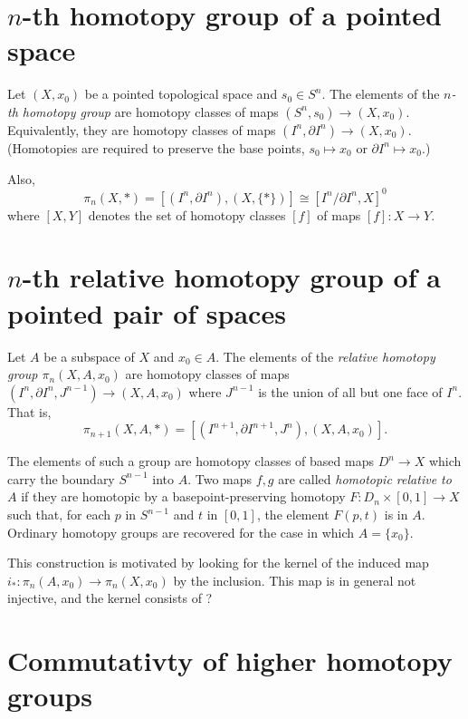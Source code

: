 \section{\texorpdfstring{$n$}{n}-th homotopy group of a pointed space}

\begin{definition}
\label{definition-homotopy-group}
Let $(X,x_0)$ be a pointed topological space and $s_0\in S^n$. The elements of
the {\it $n$-th homotopy group} are homotopy classes of maps
$(S^n,s_0)\to (X,x_0)$. Equivalently, they are homotopy classes of maps
$(I^n,\partial I^n)\to (X,x_0)$. (Homotopies are required to preserve the base
points, $s_0\mapsto x_0$ or $\partial I^n\mapsto x_0$.)

Also,
$$
\pi_n(X,*)=[(I^n,\partial I^n),(X,\{*\})]\cong[I^n/\partial I^n,X]^0
$$
where $[X,Y]$ denotes the set of homotopy classes $[f]$ of maps $[f]:X\to Y$.
\end{definition}

\section{\texorpdfstring{$n$}{n}-th relative homotopy group of 
a pointed pair of spaces}
\label{section-relative-homotopy-group}

\noindent
Let $A$ be a subspace of $X$ and $x_0\in A$. 
The elements of the {\it relative homotopy group $\pi_n(X,A,x_0)$} 
are homotopy classes of maps $(I^n,\partial I^n,J^{n-1})\to (X,A,x_0)$ 
where $J^{n-1}$ is the union of all but one face of $I^n$. 
That is,
$$
\pi_{n+1}(X,A,*)=[(I^{n+1},\partial I^{n+1},J^n),(X,A,x_0)].
$$

The elements of such a group are homotopy classes of based maps 
$D^n\to X$ which carry the boundary $S^{n-1}$ into $A$. 
Two maps $f,g$ are called {\it homotopic relative to $A$} 
if they are homotopic by a basepoint-preserving homotopy
 $F:D_n\times[0,1]\to X$ such that, for each $p$ in $S^{n-1}$ and $t$ in $[0,1]$, 
the element $F(p,t)$ is in $A$. Ordinary homotopy groups are 
recovered for the case in which $A=\{x_0\}$.

\begin{remark}
\label{remark-relative-homotopy}
This construction is motivated by 
looking for the kernel of the 
induced map $i_*:\pi_n(A,x_0)\to\pi_n(X,x_0)$ 
by the inclusion. 
This map is in general not injective, 
and the kernel consists of ?
\end{remark}

\section{Commutativty of higher homotopy groups}
\label{section-commutativity-of-higher-homotopy-groups}

